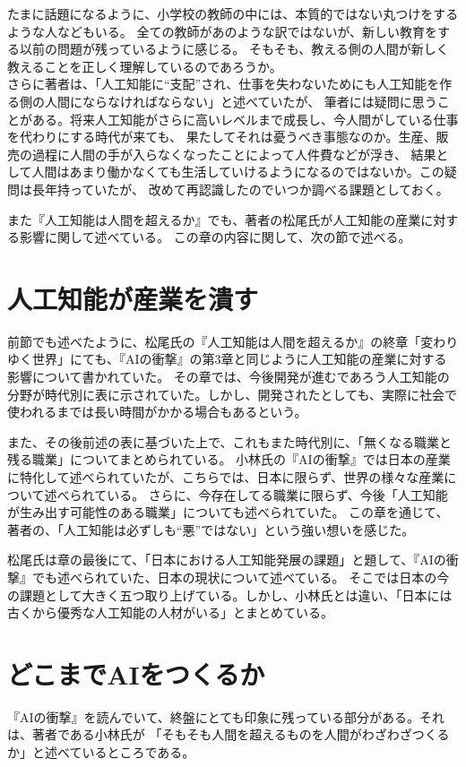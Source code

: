 \documentclass[uplatex]{jsarticle}
\begin{document}
    たまに話題になるように、小学校の教師の中には、本質的ではない丸つけをするような人などもいる。
    全ての教師があのような訳ではないが、新しい教育をする以前の問題が残っているように感じる。
    そもそも、教える側の人間が新しく教えることを正しく理解しているのであろうか。\\

    さらに著者は、「人工知能に\textquotedblleft 支配\textquotedblright され、仕事を失わないためにも人工知能を作る側の人間にならなければならない」と述べていたが、
    筆者には疑問に思うことがある。将来人工知能がさらに高いレベルまで成長し、今人間がしている仕事を代わりにする時代が来ても、
    果たしてそれは憂うべき事態なのか。生産、販売の過程に人間の手が入らなくなったことによって人件費などが浮き、
    結果として人間はあまり働かなくても生活していけるようになるのではないか。この疑問は長年持っていたが、
    改めて再認識したのでいつか調べる課題としておく。

    また『人工知能は人間を超えるか』でも、著者の松尾氏が人工知能の産業に対する影響に関して述べている。
    この章の内容に関して、次の節で述べる。

\section{人工知能が産業を潰す}
    前節でも述べたように、松尾氏の『人工知能は人間を超えるか』の終章「変わりゆく世界」にても、『AIの衝撃』の第3章と同じように人工知能の産業に対する影響について書かれていた。
    その章では、今後開発が進むであろう人工知能の分野が時代別に表に示されていた。しかし、開発されたとしても、実際に社会で使われるまでは長い時間がかかる場合もあるという。

    また、その後前述の表に基づいた上で、これもまた時代別に、「無くなる職業と残る職業」についてまとめられている。
    小林氏の『AIの衝撃』では日本の産業に特化して述べられていたが、こちらでは、日本に限らず、世界の様々な産業について述べられている。
    さらに、今存在してる職業に限らず、今後「人工知能が生み出す可能性のある職業」についても述べられていた。
    この章を通じて、著者の、「人工知能は必ずしも\textquotedblleft 悪\textquotedblright ではない」という強い想いを感じた。

    松尾氏は章の最後にて、「日本における人工知能発展の課題」と題して、『AIの衝撃』でも述べられていた、日本の現状について述べている。
    そこでは日本の今の課題として大きく五つ取り上げている。しかし、小林氏とは違い、「日本には古くから優秀な人工知能の人材がいる」とまとめている。

\section{どこまでAIをつくるか}
    『AIの衝撃』を読んでいて、終盤にとても印象に残っている部分がある。それは、著者である小林氏が
    「そもそも人間を超えるものを人間がわざわざつくるか」と述べているところである。
\end{document}
